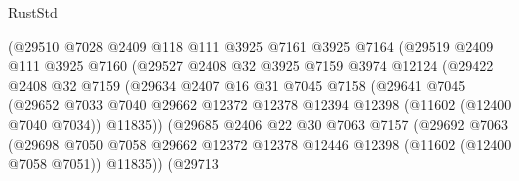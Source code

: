 \begin{lexlean}{RustStd}
\begin{coremodule}
                          (@29510
                            @7028
                            @2409
                            @118
                            @111
                            @3925
                            @7161
                            @3925
                            @7164
                            (@29519
                              @2409
                              @111
                              @3925
                              @7160
                              (@29527
                                @2408
                                @32
                                @3925
                                @7159
                                @3974
                                @12124
                                (@29422
                                  @2408
                                  @32
                                  @7159
                                  (@29634
                                    @2407
                                    @16
                                    @31
                                    @7045
                                    @7158
                                    (@29641
                                      @7045
                                      (@29652
                                        @7033
                                        @7040
                                        @29662
                                        @12372
                                        @12378
                                        @12394
                                        @12398
                                        (@11602 (@12400 @7040 @7034))
                                        @11835))
                                    (@29685
                                      @2406
                                      @22
                                      @30
                                      @7063
                                      @7157
                                      (@29692
                                        @7063
                                        (@29698
                                          @7050
                                          @7058
                                          @29662
                                          @12372
                                          @12378
                                          @12446
                                          @12398
                                          (@11602 (@12400 @7058 @7051))
                                          @11835))
                                      (@29713

\end{coremodule}
\end{lexlean}
